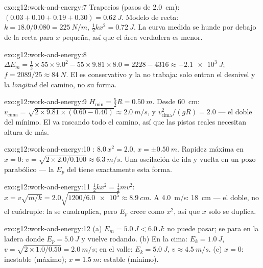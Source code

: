 \begin{solution}{exo:g12:work-and-energy:7}
Trapecios (pasos de \qty{2.0}{cm}):
$(0.03 + 0.10 + 0.19 + 0.30) = \qty{0.62}{J}$. Modelo de recta:
$k = 18.0/0.080 = \qty{225}{N/m}$, $\tfrac12 kx^2 = \qty{0.72}{J}$. La
curva medida se hunde por debajo de la recta para $x$ pequeña, así que
el área verdadera es menor.
\end{solution}

\begin{solution}{exo:g12:work-and-energy:8}
$\Delta E_m = \tfrac12 \times 55 \times 9.0^2 - 55 \times 9.81 \times
8.0 = 2228 - 4316 \approx \qty{-2.1e3}{J}$;
$f = 2089/25 \approx \qty{84}{N}$. El  es conservativo y la  no trabaja: solo entran el desnivel y la \emph{longitud} del
camino, no su forma.
\end{solution}

\begin{solution}{exo:g12:work-and-energy:9}
$H_{\min} = \tfrac52 R = \qty{0.50}{m}$. Desde \qty{60}{cm}:
$v_{\text{cima}} = \sqrt{2 \times 9.81 \times (0.60 - 0.40)} \approx
\qty{2.0}{m/s}$, y $v_{\text{cima}}^2/(gR) = 2.0$ --- el doble del
mínimo. El  va rascando  todo el camino, así que las
pistas reales necesitan altura de más.
\end{solution}

\begin{solution}{exo:g12:work-and-energy:10}
: $8.0\,x^2 = 2.0$, $x = \pm\qty{0.50}{m}$. Rapidez
máxima en $x = 0$: $v = \sqrt{2 \times 2.0/0.100} \approx
\qty{6.3}{m/s}$. Una oscilación de ida y vuelta en un pozo parabólico
--- la $E_p$ del  tiene exactamente esta forma.
\end{solution}

\begin{solution}{exo:g12:work-and-energy:11}
$\tfrac12 kx^2 = \tfrac12 mv^2$:
$x = v\sqrt{m/k} = 2.0\sqrt{1200/\num{6.0e5}} \approx \qty{8.9}{cm}$. A
\qty{4.0}{m/s}: \qty{18}{cm} --- el doble, no el cuádruple: la 
se cuadruplica, pero $E_p$ crece como $x^2$, así que $x$ solo se
duplica.
\end{solution}

\begin{solution}{exo:g12:work-and-energy:12}
(a) $E_m = \qty{5.0}{J} < \qty{6.0}{J}$: no puede pasar; se para en la
ladera donde $E_p = \qty{5.0}{J}$ y vuelve rodando. (b) En la cima:
$E_k = \qty{1.0}{J}$, $v = \sqrt{2 \times 1.0/0.50} = \qty{2.0}{m/s}$;
en el valle: $E_k = \qty{5.0}{J}$, $v \approx \qty{4.5}{m/s}$.
(c) $x = 0$: inestable (máximo); $x = \qty{1.5}{m}$: estable (mínimo).
\end{solution}

